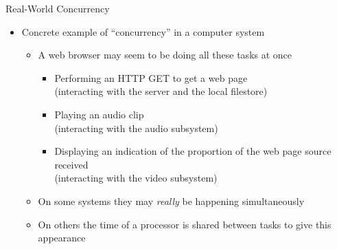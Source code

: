 \documentclass{concdistfoils}
\begin{document}
\begin{section}{Real-World Concurrency}
\begin{slide}

\begin{itemize}
\item Concrete example of ``concurrency'' in a computer system
\begin{itemize}
\item A web browser may seem to be doing all these tasks at once
\begin{itemize}
\item Performing an HTTP GET to get a web page \\(interacting with the server and the local filestore)
\item Playing an audio clip \\(interacting with the audio subsystem)
\item Displaying an indication of the proportion of the web page source received \\(interacting with the video subsystem)
\end{itemize}

\item On some systems they may \textit{really} be happening simultaneously
\item On others the time of a processor is shared between tasks to give this appearance
\end{itemize}
\end{itemize}
\end{slide}
\end{section}
\end{document}
